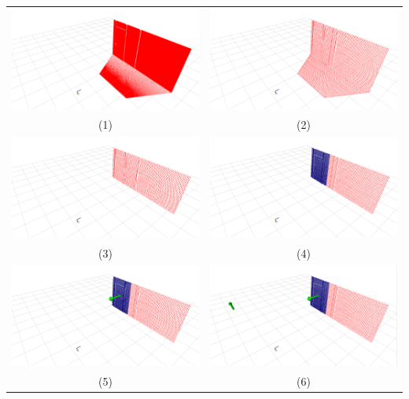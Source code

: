 
\label{annexe:suivi_mur}
\begin{tabular}{cc}
  \includegraphics[width=0.5\linewidth]{images/pcl/Selection_060} &
  \includegraphics[width=0.5\linewidth]{images/pcl/Selection_061} \\
  (1) & (2) \\
  \includegraphics[width=0.5\linewidth]{images/pcl/Selection_062} &
  \includegraphics[width=0.5\linewidth]{images/pcl/Selection_063} \\
  (3) & (4) \\
  \includegraphics[width=0.5\linewidth]{images/pcl/Selection_064} &
  \includegraphics[width=0.5\linewidth]{images/pcl/Selection_065} \\
  (5) & (6)
\end{tabular}

